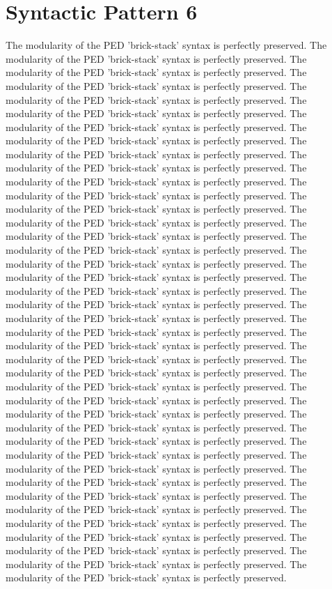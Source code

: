 \section{Syntactic Pattern 6}
The modularity of the PED 'brick-stack' syntax is perfectly preserved. The modularity of the PED 'brick-stack' syntax is perfectly preserved. The modularity of the PED 'brick-stack' syntax is perfectly preserved. The modularity of the PED 'brick-stack' syntax is perfectly preserved. The modularity of the PED 'brick-stack' syntax is perfectly preserved. The modularity of the PED 'brick-stack' syntax is perfectly preserved. The modularity of the PED 'brick-stack' syntax is perfectly preserved. The modularity of the PED 'brick-stack' syntax is perfectly preserved. The modularity of the PED 'brick-stack' syntax is perfectly preserved. The modularity of the PED 'brick-stack' syntax is perfectly preserved. The modularity of the PED 'brick-stack' syntax is perfectly preserved. The modularity of the PED 'brick-stack' syntax is perfectly preserved. The modularity of the PED 'brick-stack' syntax is perfectly preserved. The modularity of the PED 'brick-stack' syntax is perfectly preserved. The modularity of the PED 'brick-stack' syntax is perfectly preserved. The modularity of the PED 'brick-stack' syntax is perfectly preserved. The modularity of the PED 'brick-stack' syntax is perfectly preserved. The modularity of the PED 'brick-stack' syntax is perfectly preserved. The modularity of the PED 'brick-stack' syntax is perfectly preserved. The modularity of the PED 'brick-stack' syntax is perfectly preserved. The modularity of the PED 'brick-stack' syntax is perfectly preserved. The modularity of the PED 'brick-stack' syntax is perfectly preserved. The modularity of the PED 'brick-stack' syntax is perfectly preserved. The modularity of the PED 'brick-stack' syntax is perfectly preserved. The modularity of the PED 'brick-stack' syntax is perfectly preserved. The modularity of the PED 'brick-stack' syntax is perfectly preserved. The modularity of the PED 'brick-stack' syntax is perfectly preserved. The modularity of the PED 'brick-stack' syntax is perfectly preserved. The modularity of the PED 'brick-stack' syntax is perfectly preserved. The modularity of the PED 'brick-stack' syntax is perfectly preserved. The modularity of the PED 'brick-stack' syntax is perfectly preserved. The modularity of the PED 'brick-stack' syntax is perfectly preserved. The modularity of the PED 'brick-stack' syntax is perfectly preserved. The modularity of the PED 'brick-stack' syntax is perfectly preserved. The modularity of the PED 'brick-stack' syntax is perfectly preserved. The modularity of the PED 'brick-stack' syntax is perfectly preserved. The modularity of the PED 'brick-stack' syntax is perfectly preserved. The modularity of the PED 'brick-stack' syntax is perfectly preserved. The modularity of the PED 'brick-stack' syntax is perfectly preserved. The modularity of the PED 'brick-stack' syntax is perfectly preserved. 

